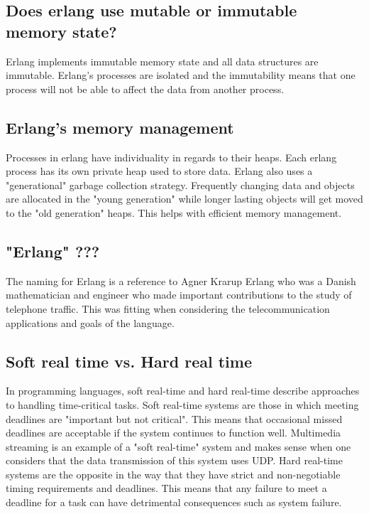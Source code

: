 \documentclass[letterpaper, 10pt]{article}
\begin{document}
\vspace{2em}

\subsection{Does erlang use mutable or immutable memory state?}

Erlang implements immutable memory state and all data structures are immutable. Erlang's processes are isolated and the immutability means that one process will not be able to affect the data from another process. 

\vspace{2em}

\subsection{Erlang's memory management}

Processes in erlang have individuality in regards to their heaps. Each erlang process has its own private heap used to store data. Erlang also uses a "generational" garbage collection strategy. Frequently changing data and objects are allocated in the "young generation" while longer lasting objects will get moved to the "old generation" heaps. This helps with efficient memory management.

\vspace{2em}

\subsection{"Erlang" ???}

The naming for Erlang is a reference to Agner Krarup Erlang who was a Danish mathematician and engineer who made important contributions to the study of telephone traffic. This was fitting when considering the telecommunication applications and goals of the language.

\vspace{2em}

\subsection{Soft real time vs. Hard real time}

In programming languages, soft real-time and hard real-time describe approaches to handling time-critical tasks. Soft real-time systems are those in which meeting deadlines are "important but not critical". This means that occasional missed deadlines are acceptable if the system continues to function well. Multimedia streaming is an example of a "soft real-time" system and makes sense when one considers that the data transmission of this system uses UDP. Hard real-time systems are the opposite in the way that they have strict and non-negotiable timing requirements and deadlines. This means that any failure to meet a deadline for a task can have detrimental consequences such as system   failure.
\end{document}
